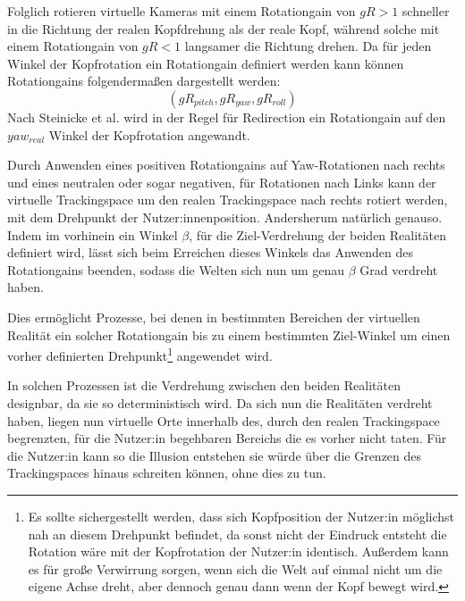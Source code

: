 Folglich rotieren virtuelle Kameras mit einem Rotationgain von $gR > 1$ schneller in die Richtung der realen Kopfdrehung als der reale Kopf, während solche mit einem Rotationgain von $gR < 1$ langsamer die Richtung drehen.
Da für jeden Winkel der Kopfrotation ein Rotationgain definiert werden kann können Rotationgains folgendermaßen dargestellt werden:
$$(gR_{pitch}, gR_{yaw}, gR_{roll})$$
Nach Steinicke et al. \cite{detection-thresholds} wird in der Regel für Redirection ein Rotationgain auf den $yaw_{real}$ Winkel der Kopfrotation angewandt.

Durch Anwenden eines positiven Rotationgains auf Yaw-Rotationen nach rechts und eines neutralen oder sogar negativen, für Rotationen nach Links kann der virtuelle Trackingspace um den realen Trackingspace nach rechts rotiert werden, mit dem Drehpunkt der Nutzer:innenposition. Andersherum natürlich genauso. Indem im vorhinein ein Winkel $\beta$, für die Ziel-Verdrehung der beiden Realitäten definiert wird, lässt sich beim Erreichen dieses Winkels das Anwenden des Rotationgains beenden, sodass die Welten sich nun um genau $\beta$ Grad verdreht haben.

Dies ermöglicht Prozesse, bei denen in bestimmten Bereichen der virtuellen Realität ein solcher  Rotationgain bis zu einem bestimmten Ziel-Winkel um einen vorher definierten Drehpunkt\footnote{Es sollte sichergestellt werden, dass sich Kopfposition der Nutzer:in möglichst nah an diesem Drehpunkt befindet, da sonst nicht der Eindruck entsteht die Rotation wäre mit der Kopfrotation der Nutzer:in identisch. Außerdem kann es für große Verwirrung sorgen, wenn sich die Welt auf einmal nicht um die eigene Achse dreht, aber dennoch genau dann wenn der Kopf bewegt wird.} angewendet wird.

In solchen Prozessen ist die Verdrehung zwischen den beiden Realitäten designbar, da sie so deterministisch wird. Da sich nun die Realitäten verdreht haben, liegen nun virtuelle Orte innerhalb des, durch den realen Trackingspace begrenzten, für die Nutzer:in begehbaren Bereichs die es vorher nicht taten.
Für die Nutzer:in kann so die Illusion entstehen sie würde über die Grenzen des Trackingspaces hinaus schreiten können, ohne dies zu tun. %

